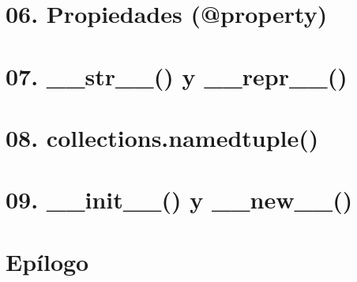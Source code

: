 \documentclass[14pt]{beamer}
\newcommand{\punto}[1]{}
\begin{document}
{
\begin{frame}[plain]
\end{frame}
}

\section{06. Propiedades (@property)}
\punto{06}

\section{07. \_\_str\_\_() y \_\_repr\_\_()}
\punto{07}

{
\begin{frame}[plain]
\end{frame}
}

{
\begin{frame}[plain]
\end{frame}
}

\section{08. collections.namedtuple()}
\punto{08}

\section{09. \_\_init\_\_() y \_\_new\_\_()}
\punto{09}

\section{Epílogo}

\end{document}
